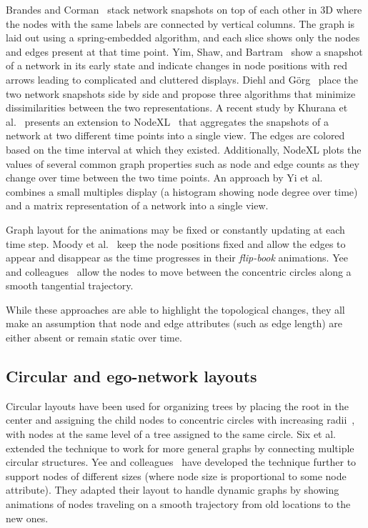 \documentclass[12pt]{cmuthesis}
\begin{document}
  Brandes and Corman~\cite{Brandes2003a} stack network snapshots on top of each other in 3D where the nodes with the same labels are connected by vertical columns. The graph is laid out using a spring-embedded algorithm, and each slice shows only the nodes and edges present at that time point. Yim, Shaw, and Bartram~\cite{Yim2009} show a snapshot of a network in its early state and indicate changes in node positions with red arrows leading to complicated and cluttered displays. Diehl and G\"{o}rg~\cite{Diehl2002} place the two network snapshots side by side and propose three algorithms that minimize dissimilarities between the two representations. A recent study by Khurana et al.~\cite{Khurana2011} presents an extension to NodeXL~\cite{Bonsignore2009} that aggregates the snapshots of a network at two different time points into a single view. The edges are colored based on the time interval at which they existed. Additionally, NodeXL plots the values of several common graph properties such as node and edge counts as they change over time between the two time points. An approach by Yi et al.~\cite{Yi2010} combines a small multiples display (a histogram showing node degree over time) and a matrix representation of a network into a single view.

  Graph layout for the animations may be fixed or constantly updating at each time step. Moody et al.~\cite{Moody2005} keep the node positions fixed and allow the edges to appear and disappear as the time progresses in their \emph{flip-book} animations. Yee and colleagues~\cite{Yee2001} allow the nodes to move between the concentric circles along a smooth tangential trajectory.

  While these approaches are able to highlight the topological changes, they all make an assumption that node and edge attributes (such as edge length) are either absent or remain static over time.


  \subsection{Circular and ego-network layouts}

  Circular layouts have been used for organizing trees by placing the root in the center and assigning the child nodes to concentric circles with increasing radii~\cite{North1997}, with nodes at the same level of a tree assigned to the same circle. Six et al.~\cite{Six1999} extended the technique to work for more general graphs by connecting multiple circular structures. Yee and colleagues~\cite{Yee2001} have developed the technique further to support nodes of different sizes (where node size is proportional to some node attribute). They adapted their layout to handle dynamic graphs by showing animations of nodes traveling on a smooth trajectory from old locations to the new ones.
\end{document}
